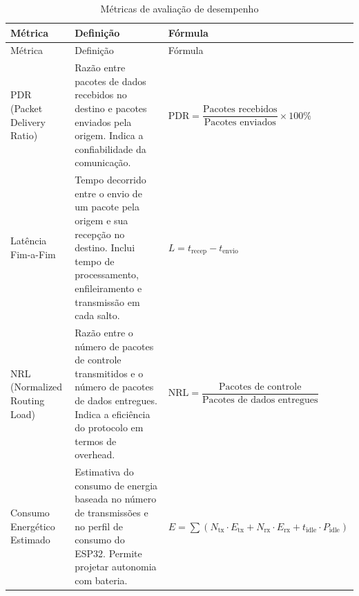 {\def\LTcaptype{quadro}
\begin{longtable}[]{@{}
  >{\raggedright\arraybackslash}p{}
  >{\raggedright\arraybackslash}p{}
  >{\raggedright\arraybackslash}p{}@{}}
\caption{Métricas de avaliação de desempenho}\label{quadro:metricas}\\
\toprule\noalign{}
\begin{minipage}[b]{\linewidth}\raggedright
Métrica
\end{minipage} & \begin{minipage}[b]{\linewidth}\raggedright
Definição
\end{minipage} & \begin{minipage}[b]{\linewidth}\raggedright
Fórmula
\end{minipage} \\
\midrule\noalign{}
\endfirsthead
\toprule\noalign{}
\begin{minipage}[b]{\linewidth}\raggedright
Métrica
\end{minipage} & \begin{minipage}[b]{\linewidth}\raggedright
Definição
\end{minipage} & \begin{minipage}[b]{\linewidth}\raggedright
Fórmula
\end{minipage} \\
\midrule\noalign{}
\endhead
\bottomrule\noalign{}
\endlastfoot
PDR (Packet Delivery Ratio) & Razão entre pacotes de dados recebidos no
destino e pacotes enviados pela origem. Indica a confiabilidade da
comunicação. & $\text{PDR} = \dfrac{\text{Pacotes recebidos}}{\text{Pacotes enviados}} \times 100\%$ \\
Latência Fim-a-Fim & Tempo decorrido entre o envio de um pacote pela
origem e sua recepção no destino. Inclui tempo de processamento,
enfileiramento e transmissão em cada salto. & $L = t_\text{recep} - t_\text{envio}$ \\
NRL (Normalized Routing Load) & Razão entre o número de pacotes de
controle transmitidos e o número de pacotes de dados entregues. Indica a
eficiência do protocolo em termos de overhead. & $\text{NRL} = \dfrac{\text{Pacotes de controle}}{\text{Pacotes de dados entregues}}$ \\
Consumo Energético Estimado & Estimativa do consumo de energia baseada
no número de transmissões e no perfil de consumo do ESP32. Permite
projetar autonomia com bateria. & $E = \sum (N_\text{tx} \cdot E_\text{tx} + N_\text{rx} \cdot E_\text{rx} + t_\text{idle} \cdot P_\text{idle})$ \\
\end{longtable}
}

